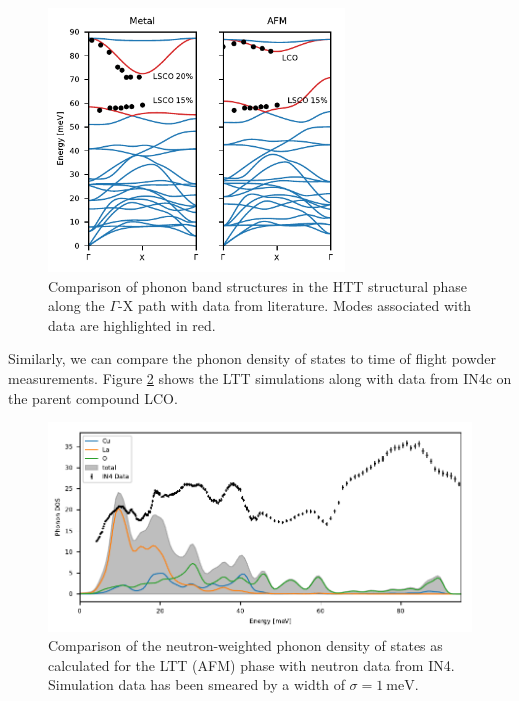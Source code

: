 \begin{figure}
	\centering
	\includegraphics[width=0.7\textwidth]{fig/simulation/htt_phonons_lit.pdf}
	\caption[phonon bands: comparison with literature]{Comparison of phonon band structures in the HTT structural phase along the $\Gamma$-X path with data from literature. Modes associated with data are highlighted in red.}
	\label{fig:htt_phonons_lit}
\end{figure}

Similarly, we can compare the phonon density of states to time of flight powder measurements. Figure \ref{fig:dos_comparison} shows the LTT simulations along with data from IN4c on the parent compound LCO.

\begin{figure}
	\centering
	\includegraphics[width=\textwidth]{fig/simulation/dos_comparison.pdf}
	\caption[phonon dos: comparison with IN4]{Comparison of the neutron-weighted phonon density of states as calculated for the LTT (AFM) phase with neutron data from IN4. Simulation data has been smeared by a width of $\sigma=\SI{1}{\milli\eV}$.}
	\label{fig:dos_comparison}
\end{figure}

